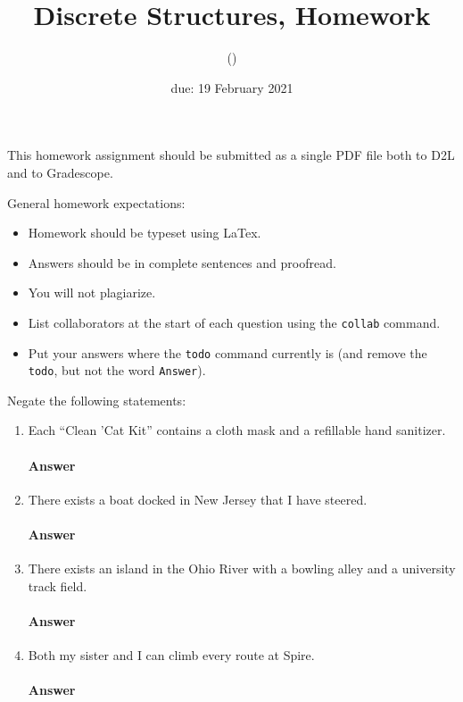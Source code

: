 \documentclass{article}
\title{Discrete Structures, Homework \hwnum}
\author{\todo{Your Name Here} (\todo{your discord handle here})}
\date{due: 19 February 2021}
\begin{document}
\maketitle

This homework assignment should be
submitted as a single PDF file both to D2L and to Gradescope.

General homework expectations:
\begin{itemize}
    \item Homework should be typeset using LaTex.
    \item Answers should be in complete sentences and proofread.
    \item You will not plagiarize.  \item List collaborators at the start of each question using the \texttt{collab} command.
    \item Put your answers where the \texttt{todo} command currently is (and
        remove the \texttt{todo}, but not the word \texttt{Answer}).
\end{itemize}

 
Negate the following statements:

\begin{enumerate}

    \item Each ``Clean 'Cat Kit''  contains a cloth mask and a refillable hand
        sanitizer.

        \paragraph{Answer}

    \item There exists a boat docked in New Jersey that I have steered.

        \paragraph{Answer}

    \item There exists an island in the Ohio River with a bowling alley and a
        university track field.

        \paragraph{Answer}

    \item Both my sister and I can climb every route at Spire.

        \paragraph{Answer}

\end{enumerate}
\end{document}
